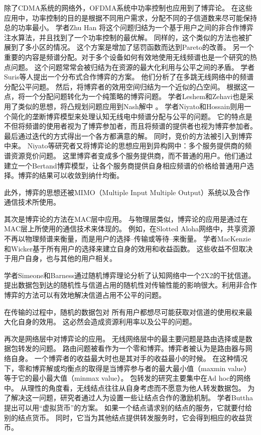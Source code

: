 除了CDMA系统的网络外，OFDMA系统中功率控制也应用到了博弈论。
在这些应用中，功率控制的目的是根据不同用户需求，分配不同的子信道数来尽可能保持总的功率最小。
学者Zhu Han 将这个问题归结为一个基于用户之间的非合作博弈注水算法，并且找到了一个功率控制的最优解\cite{HanZhu:2007}。
同样的，这个类似的方法也被扩展到了多小区的情况\cite{WangXue:2006}。
这个方案是增加了惩罚函数而达到Pareto的改善。
另一个重要的内容是频谱分配。对于多个设备如何有效地使用无线频谱也是一个研究的热点问题。
这个问题常常会被归结为在资源的最大化利用与公平之间的矛盾\cite{JiLiu:2007}。
学者Suris等人提出一个分布式合作博弈的方案\cite{SurisDasilva:2007}\cite{SurisDasilva:2009}。
他们分析了在多跳无线网络中的频谱分配公平问题。
然后，将博弈者的效用空间归结为一个近似的凸空间。
根据这一点，将一个分配问题转化为一个纯策略的博弈问题。
学者Leshem和Zehavi也是采用了类似的思想，将凸规划问题应用到Nash解中
\cite{LeshemZehavi:2008}。 学者Niyato和Hossain则用一个简化的垄断博弈模型来处理认知无线电中频谱分配与公平的问题\cite{NiyatoHossain:2008}。
它的特点是不但将频谱的使用者视为了博弈参加者，而且将频谱的提供者也视为博弈参加者。
最后通过迭代的方式得出一个各方都满意的解。
同时，竞价的方法被引入到博弈中来。
Niyato等研究者又将博弈论的思想应用到异构网中：多个服务提供商的频谱资源竞价问题\cite{NiyatoHossain:2008C}。
这里博弈者变成多个服务提供商，而不普通的用户。他们通过建立一个Bertand博弈模型，让各个服务商提供自身相应频谱的价格给普通用户选择。博弈的结果可以收敛到纳什均衡。

此外，博弈的思想还被MIMO（Multiple   Input   Multiple   Output）系统以及合作通信技术所使用\cite{LiangDandekar:2007}\cite{ChenKishore:2008}。

其次是博弈论的方法在MAC层中应用。
与物理层类似，博弈论的应用是通过在MAC层上所使用的通信技术来体现的。
例如，在Slotted Aloha网络中，共享资源不再以物理频谱来衡量，而是用户的选择--传输或等待--来衡量。
学者MacKenzie和Wicker基于所有用户的选择来建立自身的效用和收益函数\cite{MackenzieWiker:2001}。
这些收益不但取决于用户自身，也与其他的用户相关。

学者Simeone和Barness通过随机博弈理论分析了认知网络中一个2X2的干扰信道。提出数据包到达的随机性与信道占用的随机性对传输性能的影响很大。利用非合作博弈的方法可以有效地解决信道占用不公平的问题\cite{SimeoneBarNess:2007}。

在传输的过程中，随机的数据包对
所有用户都想尽可能获取对信道的使用权来最大化自身的效用。
这必然会造成资源利用率以及公平的问题。

再次是网络层中对博弈论的应用。
无线网络层中的最主要问题是路由选择或是数据包转发的问题。
路由问题被看作为一个零和博弈。博弈者被认为是路由器与网络自身。
一个博弈者的收益最大时也是其对手的收益最小的时候。
在这种情况下，零和博弈解或均衡点的取得是当博弈参与者的最大最小值（maxmin value）等于它的最小最大值（minmax value）。
包转发的研究主要集中在Ad hoc的网络中。
从理性的角度看，无线结点往往从自身考虑而不愿意为他人转发数据包\cite{Pavlidou2008}。
为了解决这一问题，研究者通过人为设置一些让结点合作的激励机制。
学者Buttha提出可以用“虚拟货币”的方案\cite{Butty_Hubaux_2003}。
如果一个结点请求别的结点的服务，它就要付给别的结点货币。
同时，它当为其他结点提供转发服务时，它会得到相应的收益货币。

